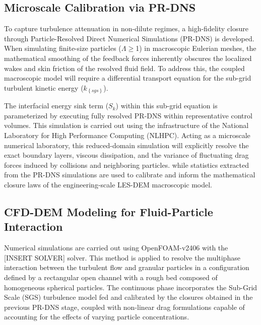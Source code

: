 \hypertarget{microscale-calibration-via-pr-dns}{%
\subsection{Microscale Calibration via PR-DNS}\label{microscale-calibration-via-pr-dns}}

To capture turbulence attenuation in non-dilute regimes, a high-fidelity closure through Particle-Resolved Direct Numerical Simulations (PR-DNS) is developed. When simulating finite-size particles (\(\Lambda \geq\)1) in macroscopic Eulerian meshes, the mathematical smoothing of the feedback forces inherently obscures the localized wakes and skin friction of the resolved fluid field. To address this, the coupled macroscopic model will require a differential transport equation for the sub-grid turbulent kinetic energy (\(k_{\left\{ sgs \right\}}\)).

The interfacial energy sink term (\(S_{k}\)) within this sub-grid equation is parameterized by executing fully resolved PR-DNS within representative control volumes. This simulation is carried out using the infrastructure of the National Laboratory for High Performance Computing (NLHPC). Acting as a microscale numerical laboratory, this reduced-domain simulation will explicitly resolve the exact boundary layers, viscous dissipation, and the variance of fluctuating drag forces induced by collisions and neighboring particles. while statistics extracted from the PR-DNS simulations are used to calibrate and inform the mathematical closure laws of the engineering-scale LES-DEM macroscopic model.

\hypertarget{cfd-dem-modeling-for-fluid-particle-interaction}{%
\subsection{CFD-DEM Modeling for Fluid-Particle Interaction}\label{cfd-dem-modeling-for-fluid-particle-interaction}}

Numerical simulations are carried out using OpenFOAM-v2406 with the {[}INSERT SOLVER{]} solver. This method is applied to resolve the multiphase interaction between the turbulent flow and granular particles in a configuration defined by a rectangular open channel with a rough bed composed of homogeneous spherical particles. The continuous phase incorporates the Sub-Grid Scale (SGS) turbulence model fed and calibrated by the closures obtained in the previous PR-DNS stage, coupled with non-linear drag formulations capable of accounting for the effects of varying particle concentrations.

